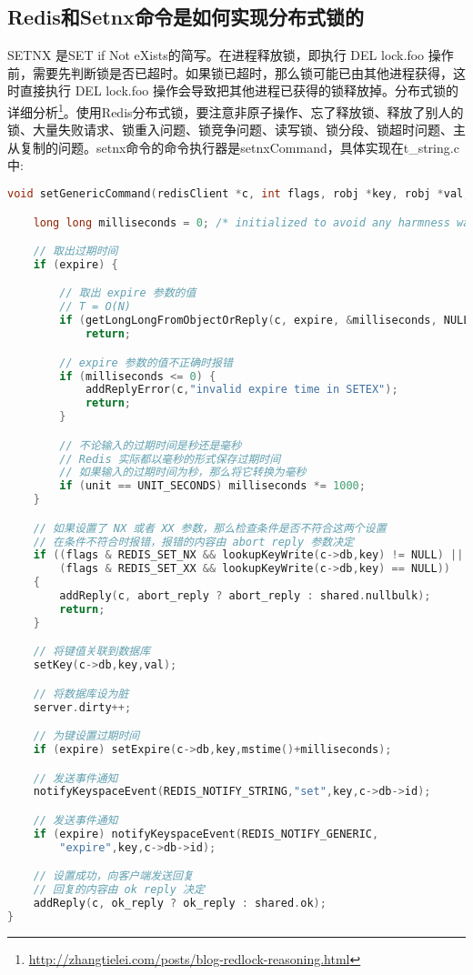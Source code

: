 \documentclass[../../../interview-questions.tex]{subfiles}
\begin{document}
\subsection{Redis和Setnx命令是如何实现分布式锁的}

SETNX 是SET if Not eXists的简写。在进程释放锁，即执行 DEL lock.foo 操作前，需要先判断锁是否已超时。如果锁已超时，那么锁可能已由其他进程获得，这时直接执行 DEL lock.foo 操作会导致把其他进程已获得的锁释放掉。分布式锁的详细分析\footnote{\url{http://zhangtielei.com/posts/blog-redlock-reasoning.html}}。使用Redis分布式锁，要注意非原子操作、忘了释放锁、释放了别人的锁、大量失败请求、锁重入问题、锁竞争问题、读写锁、锁分段、锁超时问题、主从复制的问题。setnx命令的命令执行器是setnxCommand，具体实现在t\_string.c中:

\begin{lstlisting}[language=C]
void setGenericCommand(redisClient *c, int flags, robj *key, robj *val, robj *expire, int unit, robj *ok_reply, robj *abort_reply) {

    long long milliseconds = 0; /* initialized to avoid any harmness warning */

    // 取出过期时间
    if (expire) {

        // 取出 expire 参数的值
        // T = O(N)
        if (getLongLongFromObjectOrReply(c, expire, &milliseconds, NULL) != REDIS_OK)
            return;

        // expire 参数的值不正确时报错
        if (milliseconds <= 0) {
            addReplyError(c,"invalid expire time in SETEX");
            return;
        }

        // 不论输入的过期时间是秒还是毫秒
        // Redis 实际都以毫秒的形式保存过期时间
        // 如果输入的过期时间为秒，那么将它转换为毫秒
        if (unit == UNIT_SECONDS) milliseconds *= 1000;
    }

    // 如果设置了 NX 或者 XX 参数，那么检查条件是否不符合这两个设置
    // 在条件不符合时报错，报错的内容由 abort reply 参数决定
    if ((flags & REDIS_SET_NX && lookupKeyWrite(c->db,key) != NULL) ||
        (flags & REDIS_SET_XX && lookupKeyWrite(c->db,key) == NULL))
    {
        addReply(c, abort_reply ? abort_reply : shared.nullbulk);
        return;
    }

    // 将键值关联到数据库
    setKey(c->db,key,val);

    // 将数据库设为脏
    server.dirty++;

    // 为键设置过期时间
    if (expire) setExpire(c->db,key,mstime()+milliseconds);

    // 发送事件通知
    notifyKeyspaceEvent(REDIS_NOTIFY_STRING,"set",key,c->db->id);

    // 发送事件通知
    if (expire) notifyKeyspaceEvent(REDIS_NOTIFY_GENERIC,
        "expire",key,c->db->id);

    // 设置成功，向客户端发送回复
    // 回复的内容由 ok reply 决定
    addReply(c, ok_reply ? ok_reply : shared.ok);
}
\end{lstlisting}
\end{document}
